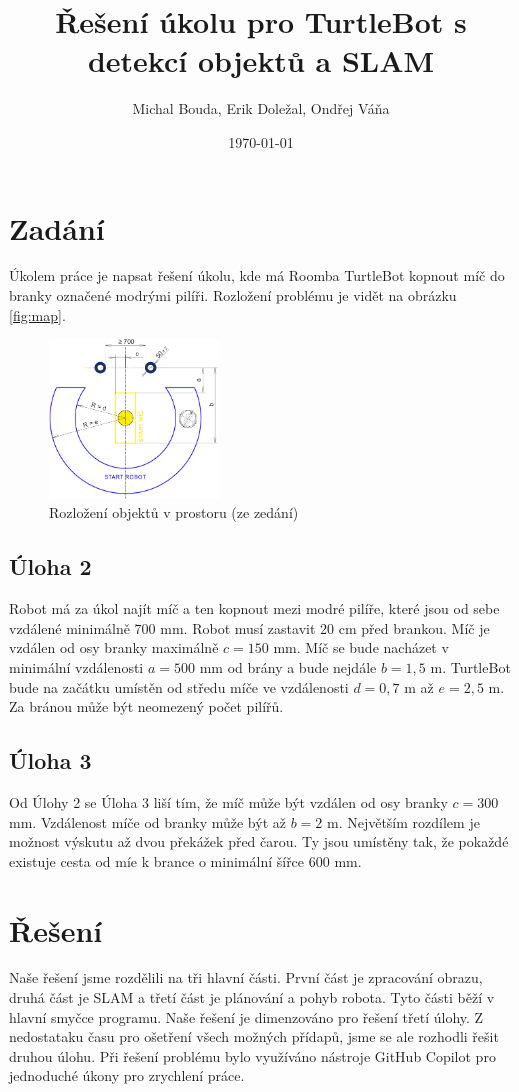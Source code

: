 \documentclass[a4paper,12pt]{article}
\title{Řešení úkolu pro TurtleBot s detekcí objektů a SLAM}
\author{Michal Bouda, Erik Doležal, Ondřej Váňa}
\date{\today}
\begin{document}
\maketitle

\tableofcontents

\section{Zadání}
Úkolem práce je napsat řešení úkolu, kde má Roomba TurtleBot kopnout míč do branky označené modrými pilíři.
Rozložení problému je vidět na obrázku \eqref{fig:map}.
\begin{figure}[H]
\centering
\includegraphics[width=0.4\textwidth]{pictures/map.png}
\caption{Rozložení objektů v prostoru (ze zedání)}
\label{fig:map}	
\end{figure}

\subsection{Úloha 2}
Robot má za úkol najít míč a ten kopnout mezi modré pilíře, které jsou od sebe vzdálené minimálně $700$ mm. Robot musí zastavit $20$ cm před brankou. Míč je vzdálen od osy branky maximálně $c = 150$ mm.
Míč se bude nacházet v minimální vzdálenosti $a = 500$ mm od brány a bude nejdále $b = 1,5$ m. TurtleBot bude na začátku umístěn od středu míče ve vzdálenosti $d = 0,7$ m až $e = 2,5$ m.
Za bránou může být neomezený počet pilířů.

\subsection{Úloha 3}
Od Úlohy 2 se Úloha 3 liší tím, že míč může být vzdálen od osy branky $c = 300$ mm. Vzdálenost míče od branky může být až $b = 2$ m.
Největším rozdílem je možnost výskutu až dvou překážek před čarou. Ty jsou umístěny tak, že pokaždé existuje cesta od míe k brance o minimální šířce $600$ mm.

\section{Řešení}
Naše řešení jsme rozdělili na tři hlavní části. První část je zpracování obrazu, druhá část je SLAM a třetí část je plánování a pohyb robota. Tyto části běží v hlavní smyčce programu. Naše řešení je dimenzováno pro řešení třetí úlohy. Z nedostataku času pro ošetření všech možných přídapů, jsme se ale rozhodli řešit druhou úlohu. 
Při řešení problému bylo využíváno nástroje GitHub Copilot pro jednoduché úkony pro zrychlení práce. 
\end{document}
